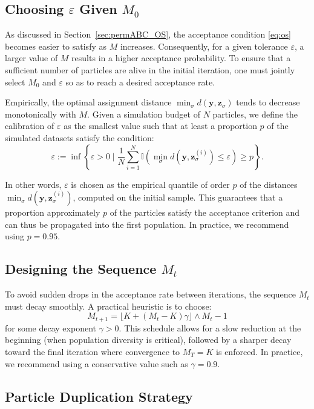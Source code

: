 \documentclass[11pt,a4paper]{article}
\def\obsdata{\mathbf{y}}
\def\simdata{\mathbf{z}}
\theoremstyle{plain}
\theoremstyle{definition}
\theoremstyle{remark}
\begin{document}
\subsection{Choosing \( \varepsilon \) Given \( M_0 \)}

As discussed in Section~\ref{sec:permABC_OS}, the acceptance condition \eqref{eq:os} becomes easier to satisfy as \( M \) increases. Consequently, for a given tolerance \( \varepsilon \), a larger value of \( M \) results in a higher acceptance probability. To ensure that a sufficient number of particles are alive in the initial iteration, one must jointly select \( M_0 \) and \( \varepsilon \) so as to reach a desired acceptance rate.

Empirically, the optimal assignment distance \( \min_{\sigma} d(\obsdata, \simdata_\sigma) \) tends to decrease monotonically with \( M \). Given a simulation budget of \( N \) particles, we define the calibration of \( \varepsilon \) as the smallest value such that at least a proportion \( p \) of the simulated datasets satisfy the condition:
\[
\varepsilon := \inf \left\{ \varepsilon > 0 \mid \frac{1}{N} \sum_{i=1}^N \mathbb{I} \left( \min_\sigma d(\obsdata, \simdata^{(i)}_\sigma) \leq \varepsilon \right) \geq p \right\}.
\]

In other words, \( \varepsilon \) is chosen as the empirical quantile of order \( p \) of the distances \( \min_\sigma d(\obsdata, \simdata^{(i)}_\sigma) \), computed on the initial sample. This guarantees that a proportion approximately $p$ of the particles satisfy the acceptance criterion and can thus be propagated into the first population. In practice, we recommend using \( p = 0.95 \).

\subsection{Designing the Sequence \( M_t \)}

To avoid sudden drops in the acceptance rate between iterations, the sequence \( M_t \) must decay smoothly. A practical heuristic is to choose:
\[
M_{t+1} = \lfloor K + (M_t - K) \gamma \rfloor \wedge M_t -1
\]
for some decay exponent \( \gamma > 0 \). This schedule allows for a slow reduction at the beginning (when population diversity is critical), followed by a sharper decay toward the final iteration where convergence to \( M_T = K \) is enforced. In practice, we recommend using a conservative value such as \( \gamma = 0.9 \).

\subsection{Particle Duplication Strategy}
\end{document}
